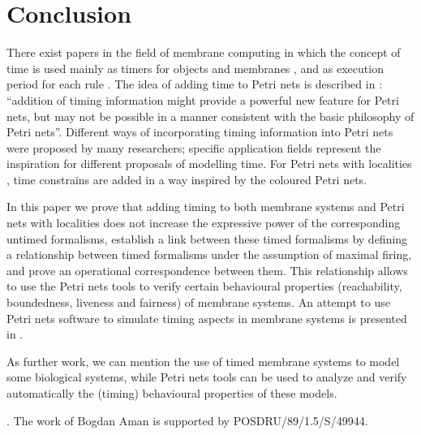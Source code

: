 \documentclass{eptcs}
\begin{document}
\section{Conclusion}
\label{section:conclusion}

There exist papers in the field of membrane computing in which the
concept of time is used mainly as timers for objects and
membranes \cite{CompMod09,IJCCC10}, and as execution period for
each rule \cite{Cavaliere05,Cavaliere10}.
The idea of adding time to Petri nets is described in
\cite{Peterson81}: ``addition of timing information might
provide a powerful new feature for Petri nets, but may not be
possible in a manner consistent with the basic philosophy of Petri
nets''. Different ways of incorporating timing information into
Petri nets were proposed by many researchers; specific application
fields represent the inspiration for different proposals of
modelling time. For Petri nets with localities \cite{Kleijn06},
time constrains are added in a way inspired by the coloured Petri nets.

In this paper we prove that adding timing to both membrane
systems and Petri nets with localities does not increase the
expressive power of the corresponding untimed formalisms,
establish a link between these timed formalisms by defining
a relationship between timed formalisms under the assumption of
maximal firing, and prove an operational correspondence between
them. This relationship allows to use the Petri nets
tools to verify certain behavioural properties (reachability,
boundedness, liveness and fairness) of membrane systems.
An attempt to use Petri nets software to simulate timing aspects in membrane
systems is presented in \cite{Profir05}.

As further work, we can mention the use of timed membrane systems to model
some biological systems, while Petri nets tools can be used to analyze and verify
automatically the (timing) behavioural properties of these models.

\medskip

. The work of Bogdan Aman is
supported by POSDRU/89/1.5/S/49944.
\end{document}
